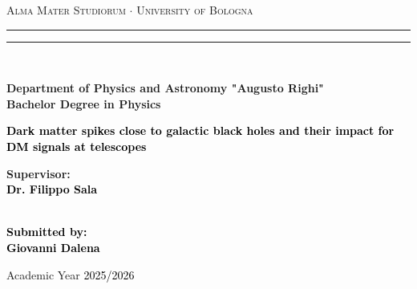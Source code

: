 
\begin{titlepage}
%
%
%
%
\begin{center}
{{\Large{\textsc{Alma Mater Studiorum $\cdot$ University of Bologna}}}} 
\rule[0.1cm]{15.8cm}{0.1mm}
\rule[0.5cm]{15.8cm}{0.6mm}
\\\vspace{3mm}

{\small{\bf Department of Physics and Astronomy "Augusto Righi" 
        \\Bachelor Degree in Physics}}

\end{center}

\vspace{23mm}

\begin{center}\textcolor{black}{
{\LARGE{\bf Dark matter spikes close to galactic black holes and their impact for DM signals at telescopes}}\\
}\end{center}

\vspace{50mm} \par \noindent

\begin{minipage}[t]{0.47\textwidth}

{\large{\bf Supervisor: \vspace{2mm}\\\textcolor{black}{
Dr. Filippo Sala}\\\\

}}
\end{minipage}
%
\hfill
%
\begin{minipage}[t]{0.47\textwidth}\raggedleft \textcolor{black}{
{\large{\bf Submitted by:
\vspace{2mm}\\
%
%
Giovanni Dalena}}}
\end{minipage}

\vspace{40mm}

\begin{center}
%
%
Academic Year \textcolor{black}{ 2025/2026}
\end{center}


\end{titlepage}

